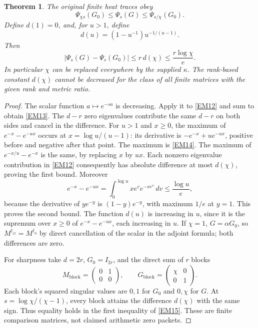 \documentclass[11pt]{article}
\newtheorem{theorem}{Theorem}
\newcommand{\adjzero}{\dagger_0}
\newcommand{\adjg}{\dagger_G}
\begin{document}
\begin{theorem}
The original finite heat traces obey
\begin{equation}
 \Psi_{\chi s}(G_0)\le\Psi_s(G)\le\Psi_{s/\chi}(G_0).
 \tag{EM13}\label{EM13}
\end{equation}
Define \(d(1)=0\), and, for \(u>1\), define
\begin{equation}
 d(u)=(1-u^{-1})u^{-1/(u-1)}.
 \tag{EM14}\label{EM14}
\end{equation}
Then
\begin{equation}
 |\Psi_s(G)-\Psi_s(G_0)|
 \le r\,d(\chi)\le\frac{r\log\chi}{e}.
 \tag{EM15}\label{EM15}
\end{equation}
In particular \(\chi\) can be replaced everywhere by the supplied
\(\kappa\). The rank-based constant \(d(\chi)\) cannot be decreased for
the class of all finite matrices with the given rank and metric ratio.
\end{theorem}
\begin{proof}
The scalar function \(a\mapsto e^{-sa}\) is decreasing. Apply it to
\eqref{EM12} and sum to obtain \eqref{EM13}. The \(d-r\) zero
eigenvalues contribute the same \(d-r\) on both sides and cancel in
the difference. For \(u>1\) and \(x\ge0\), the maximum of
\(e^{-x}-e^{-ux}\) occurs at \(x=\log u/(u-1)\):
its derivative is \(-e^{-x}+u e^{-ux}\), positive before and negative
after that point. The maximum is \eqref{EM14}. The maximum of
\(e^{-x/u}-e^{-x}\) is the same, by replacing \(x\) by \(ux\).
Each nonzero eigenvalue contribution in \eqref{EM12} consequently has
absolute difference at most \(d(\chi)\), proving the first bound.
Moreover
\[
 e^{-x}-e^{-ux}=\int_0^{\log u}xe^v e^{-xe^v}\,dv
       \le\frac{\log u}{e},
\]
because the derivative of \(y e^{-y}\) is \((1-y)e^{-y}\), with maximum
\(1/e\) at \(y=1\). This proves the second bound.
The function \(d(u)\) is increasing in \(u\), since it is the supremum
over \(x\ge0\) of \(e^{-x}-e^{-ux}\), each increasing in \(u\).
If \(\chi=1\), \(G=\alpha G_0\), so \(M^{\adjg}=M^{\adjzero}\)
by direct cancellation of the scalar in the adjoint formula; both
differences are zero.

For sharpness take \(d=2r\), \(G_0=I_{2r}\), and the direct sum of \(r\)
blocks
\[
 M_{\mathrm{block}}=\begin{pmatrix}0&1\\0&0\end{pmatrix},
 \qquad
 G_{\mathrm{block}}=\begin{pmatrix}\chi&0\\0&1\end{pmatrix}.
\]
Each block's squared singular values are \(0,1\) for \(G_0\) and
\(0,\chi\) for \(G\). At \(s=\log\chi/(\chi-1)\), every block attains
the difference \(d(\chi)\) with the same sign. Thus equality holds
in the first inequality of \eqref{EM15}. These are finite comparison
matrices, not claimed arithmetic zero packets.
\end{proof}
\end{document}
